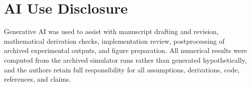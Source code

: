 \section*{AI Use Disclosure}
Generative AI was used to assist with manuscript drafting and revision, mathematical derivation checks, implementation review, postprocessing of archived experimental outputs, and figure preparation. All numerical results were computed from the archived simulator runs rather than generated hypothetically, and the authors retain full responsibility for all assumptions, derivations, code, references, and claims.

